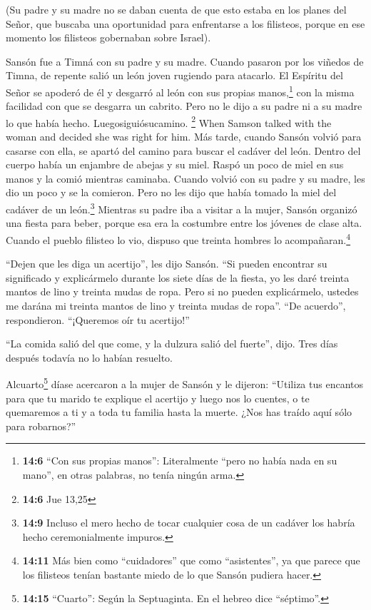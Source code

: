  (Su padre y su madre no se daban cuenta de que esto
estaba en los planes del Señor, que buscaba una oportunidad para
enfrentarse a los filisteos, porque en ese momento los filisteos
gobernaban sobre Israel).

 Sansón fue a Timná con su padre y su madre. Cuando
pasaron por los viñedos de Timna, de repente salió un león joven
rugiendo para atacarlo.  El Espíritu del Señor se apoderó
de él y desgarró al león con sus propias manos,\footnote{\textbf{14:6}
  ``Con sus propias manos'': Literalmente ``pero no había nada en su
  mano'', en otras palabras, no tenía ningún arma.} con la misma
facilidad con que se desgarra un cabrito. Pero no le dijo a su padre ni
a su madre lo que había hecho. Luegosiguiósucamino. \footnote{\textbf{14:6}
  Jue 13,25}  When Samson talked with the woman and
decided she was right for him.  Más tarde, cuando Sansón
volvió para casarse con ella, se apartó del camino para buscar el
cadáver del león. Dentro del cuerpo había un enjambre de abejas y su
miel.  Raspó un poco de miel en sus manos y la comió
mientras caminaba. Cuando volvió con su padre y su madre, les dio un
poco y se la comieron. Pero no les dijo que había tomado la miel del
cadáver de un león.\footnote{\textbf{14:9} Incluso el mero hecho de
  tocar cualquier cosa de un cadáver los habría hecho ceremonialmente
  impuros.}  Mientras su padre iba a visitar a la mujer,
Sansón organizó una fiesta para beber, porque esa era la costumbre entre
los jóvenes de clase alta.  Cuando el pueblo filisteo lo
vio, dispuso que treinta hombres lo acompañaran.\footnote{\textbf{14:11}
  Más bien como ``cuidadores'' que como ``asistentes'', ya que parece
  que los filisteos tenían bastante miedo de lo que Sansón pudiera
  hacer.}

 ``Dejen que les diga un acertijo'', les dijo Sansón.
``Si pueden encontrar su significado y explicármelo durante los siete
días de la fiesta, yo les daré treinta mantos de lino y treinta mudas de
ropa.  Pero si no pueden explicármelo, ustedes me darána
mi treinta mantos de lino y treinta mudas de ropa''. ``De acuerdo'',
respondieron. ``¡Queremos oír tu acertijo!''

 ``La comida salió del que come, y la dulzura salió del
fuerte'', dijo. Tres días después todavía no lo habían resuelto.

 Alcuarto\footnote{\textbf{14:15} ``Cuarto'': Según la
  Septuaginta. En el hebreo dice ``séptimo''.} díase acercaron a la
mujer de Sansón y le dijeron: ``Utiliza tus encantos para que tu marido
te explique el acertijo y luego nos lo cuentes, o te quemaremos a ti y a
toda tu familia hasta la muerte. ¿Nos has traído aquí sólo para
robarnos?''

